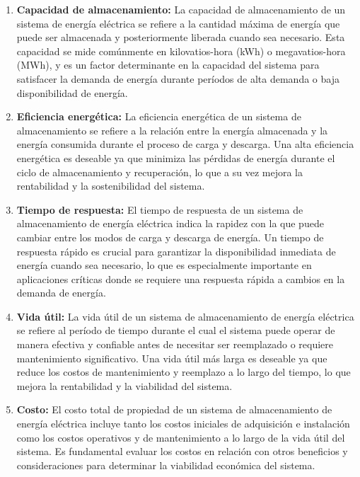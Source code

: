 \documentclass[11pt]{article}
\begin{document}
            \begin{enumerate}
                \item \textbf{ Capacidad de almacenamiento:} La capacidad de almacenamiento de un sistema de energía eléctrica se refiere a la cantidad
                máxima de energía que puede ser almacenada y posteriormente liberada cuando sea
                necesario. Esta capacidad se mide comúnmente en kilovatios-hora (kWh) o
                megavatios-hora (MWh), y es un factor determinante en la capacidad del sistema para
                satisfacer la demanda de energía durante períodos de alta demanda o baja disponibilidad
                de energía.

                \item \textbf{Eficiencia energética:} La eficiencia energética de un sistema de almacenamiento se refiere a la relación entre la
                energía almacenada y la energía consumida durante el proceso de carga y descarga. Una
                alta eficiencia energética es deseable ya que minimiza las pérdidas de energía durante el
                ciclo de almacenamiento y recuperación, lo que a su vez mejora la rentabilidad y la
                sostenibilidad del sistema.

                \item \textbf{Tiempo de respuesta:} El tiempo de respuesta de un sistema de almacenamiento de energía eléctrica indica la
                rapidez con la que puede cambiar entre los modos de carga y descarga de energía. Un
                tiempo de respuesta rápido es crucial para garantizar la disponibilidad inmediata de energía
                cuando sea necesario, lo que es especialmente importante en aplicaciones críticas donde
                se requiere una respuesta rápida a cambios en la demanda de energía.

                \item \textbf{Vida útil:} La vida útil de un sistema de almacenamiento de energía eléctrica se refiere al período de
                tiempo durante el cual el sistema puede operar de manera efectiva y confiable antes de
                necesitar ser reemplazado o requiere mantenimiento significativo. Una vida útil más larga es
                deseable ya que reduce los costos de mantenimiento y reemplazo a lo largo del tiempo, lo
                que mejora la rentabilidad y la viabilidad del sistema.

                \item \textbf{Costo:} El costo total de propiedad de un sistema de almacenamiento de energía eléctrica incluye
                tanto los costos iniciales de adquisición e instalación como los costos operativos y de
                mantenimiento a lo largo de la vida útil del sistema. Es fundamental evaluar los costos en
                relación con otros beneficios y consideraciones para determinar la viabilidad económica del
                sistema.


\end{enumerate}
\end{document}
